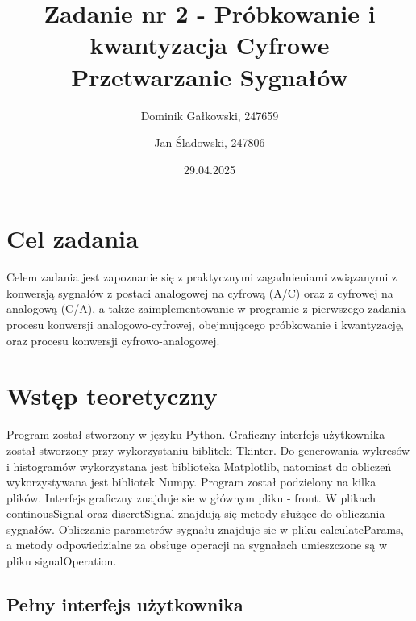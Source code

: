 \documentclass{article}
\title{{\bf Zadanie nr 2 - Próbkowanie i kwantyzacja}\linebreak
Cyfrowe Przetwarzanie Sygnałów}
\author{Dominik Gałkowski, 247659 \and Jan Śladowski, 247806}
\date{29.04.2025}
\begin{document}
\clearpage\maketitle
\thispagestyle{empty}
\newpage
\setcounter{page}{1}
\section{Cel zadania}

Celem zadania jest zapoznanie się z praktycznymi zagadnieniami związanymi z konwersją sygnałów z postaci analogowej na cyfrową (A/C) oraz z cyfrowej na analogową (C/A), a także zaimplementowanie w programie z pierwszego zadania procesu konwersji analogowo-cyfrowej, obejmującego próbkowanie i kwantyzację, oraz procesu konwersji cyfrowo-analogowej.

\section{Wstęp teoretyczny}

Program został stworzony w języku Python. Graficzny interfejs użytkownika został stworzony
przy wykorzystaniu bibliteki Tkinter. Do generowania wykresów i histogramów wykorzystana jest biblioteka Matplotlib,
natomiast do obliczeń wykorzystywana jest bibliotek Numpy. Program został podzielony na kilka plików.
Interfejs graficzny znajduje sie w głównym pliku - front. W plikach continousSignal oraz discretSignal znajdują się
metody służące do obliczania sygnałów. Obliczanie parametrów sygnału znajduje sie w pliku calculateParams, a
metody odpowiedzialne za obsługe operacji na sygnałach umieszczone są w pliku signalOperation.

\subsection{Pełny interfejs użytkownika} 
\end{document}
